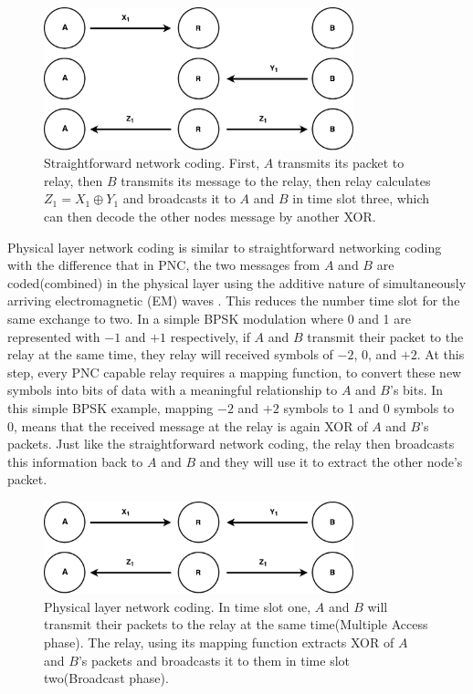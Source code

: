 \begin{figure}
    \centering
    \includegraphics[width=0.8\textwidth]{figures/straightforwardNC.pdf}
    \caption{Straightforward network coding. First, $A$ transmits its packet to relay, then $B$ transmits its message to the relay, then relay calculates $Z_1=X_1 \oplus Y_1$ and broadcasts it to $A$ and $B$ in time slot three, which can then decode the other nodes message by another XOR.} \label{fig:straightforwardNC}
\end{figure}

Physical layer network coding is similar to straightforward networking coding with the difference that in PNC, the two messages from $A$ and $B$ are coded(combined) in the physical layer using the additive nature of simultaneously arriving electromagnetic (EM) waves \cite{zhang2006hot}. This reduces the number time slot for the same exchange to two. In a simple BPSK modulation where 0 and 1 are represented with $-1$ and $+1$ respectively, if $A$ and $B$ transmit their packet to the relay at the same time, they relay will received symbols of $-2$, $0$, and $+2$. At this step, every PNC capable relay requires a mapping function, to convert these new symbols into bits of data with a meaningful relationship to $A$ and $B$'s bits. In this simple BPSK example, mapping $-2$ and $+2$ symbols to 1 and $0$ symbols to 0, means that the received message at the relay is again XOR of $A$ and $B$'s packets. Just like the straightforward network coding, the relay then broadcasts this information back to $A$ and $B$ and they will use it to extract the other node's packet.

\begin{figure}[h]
    \centering
    \includegraphics[width=0.8\textwidth]{figures/threeNodePnc.pdf}
    \caption{Physical layer network coding. In time slot one, $A$ and $B$ will transmit their packets to the relay at the same time(Multiple Access phase). The relay, using its mapping function extracts XOR of $A$ and $B$'s packets and broadcasts it to them in time slot two(Broadcast phase).} \label{fig:threeNodePnc}
\end{figure}

